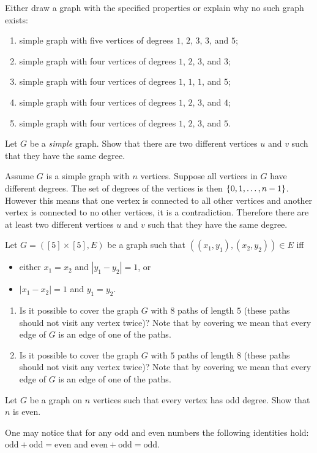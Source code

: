 \begin{chapterendexercises}
  \exercise Either draw a graph with the specified properties or explain why
    no such graph exists:
    \begin{enumerate}[nolistsep]
      \item simple graph with five vertices of degrees $1$, $2$, $3$, $3$,
        and $5$;
      \item simple graph with four vertices of degrees $1$, $2$, $3$, and $3$;
      \item simple graph with four vertices of degrees $1$, $1$, $1$, and $5$;
      \item simple graph with four vertices of degrees $1$, $2$, $3$, and $4$;
      \item simple graph with four vertices of degrees $1$, $2$, $3$, and $5$.
    \end{enumerate}
  \exercise Let $G$ be a \emph{simple} graph. Show that there are two different
    vertices $u$ and $v$ such that they have the same degree.
    \begin{solution}
      Assume $G$ is a simple graph with $n$ vertices. Suppose all vertices in
      $G$ have different degrees. The set of degrees of the vertices is then
      $\set{0, 1, \dots, n - 1}$. However this means that one vertex is
      connected to all other vertices and another vertex is connected to no
      other vertices, it is a contradiction. Therefore there are at least two
      different vertices $u$ and $v$ such that they have the same degree.
    \end{solution}
  \exercise Let $G = ([5] \times [5], E)$ be a graph such that 
    $((x_1, y_1), (x_2, y_2)) \in E$ iff
    \begin{itemize}
      \item either $x_1 = x_2$ and $|y_1 - y_2| = 1$, or
      \item $|x_1 - x_2| = 1$ and $y_1 = y_2$.
    \end{itemize}

    \begin{enumerate}
      \item Is it possible to cover the graph $G$ with $8$ paths of length $5$
        (these paths should not visit any vertex twice)? Note that by covering we
        mean that every edge of $G$ is an edge of one of the paths.
      \item Is it possible to cover the graph $G$ with $5$ paths of length $8$
        (these paths should not visit any vertex twice)? Note that by covering
        we mean that every edge of $G$ is an edge of one of the paths.
    \end{enumerate}
  \exercise Let $G$ be a graph on $n$ vertices such that every vertex has odd
    degree. Show that $n$ is even.
    \begin{solution}
      One may notice that for any odd and even numbers the following identities
      hold:
      $\mathrm{odd} + \mathrm{odd} = \mathrm{even}$ and $\mathrm{even} +
      \mathrm{odd} = \mathrm{odd}$.


\end{solution}
\end{chapterendexercises}
